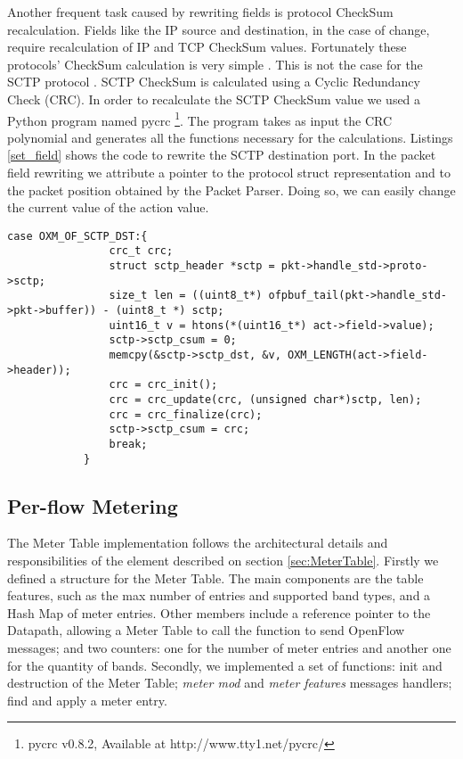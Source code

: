 Another frequent task caused by rewriting fields is protocol CheckSum recalculation. Fields like the IP source and destination, in the case of change, require recalculation of IP and TCP CheckSum values. Fortunately these protocols' CheckSum calculation is very simple \cite{rfc1071}. This is not the case for the SCTP protocol \cite{rfc3309}. SCTP CheckSum is calculated using a Cyclic Redundancy Check (CRC). In order to recalculate the SCTP CheckSum value we used a Python program named pycrc \footnote{pycrc v0.8.2, Available at http://www.tty1.net/pycrc/}. The program takes as input the CRC polynomial and generates all the functions necessary for the calculations. Listings \ref{set_field} shows the code to rewrite the SCTP destination port. In the packet field rewriting we attribute a pointer to the protocol struct representation and to the packet position obtained by the Packet Parser. Doing so, we can easily change the current value of the action value.
\\
\begin{lstlisting}[caption={Ethernet parsing in the nbee_link module}, label=set_field,]
case OXM_OF_SCTP_DST:{
                crc_t crc;
                struct sctp_header *sctp = pkt->handle_std->proto->sctp;                
                size_t len = ((uint8_t*) ofpbuf_tail(pkt->handle_std->pkt->buffer)) - (uint8_t *) sctp;
                uint16_t v = htons(*(uint16_t*) act->field->value);
                sctp->sctp_csum = 0;
                memcpy(&sctp->sctp_dst, &v, OXM_LENGTH(act->field->header));
                crc = crc_init();
                crc = crc_update(crc, (unsigned char*)sctp, len);                            
                crc = crc_finalize(crc);
                sctp->sctp_csum = crc;
                break;        
            }
\end{lstlisting}  

\subsection{Per-flow Metering}

    The Meter Table implementation follows the architectural details and responsibilities of the element described on section \ref{sec:MeterTable}.
Firstly we defined a structure for the Meter Table. The main components are the table features, such as the max number of entries and supported band types, and a Hash Map of meter entries. Other members include a reference pointer to the Datapath, allowing a Meter Table to call the function to send OpenFlow messages; and two counters: one for the number of meter entries and another one for the quantity of bands. Secondly, we implemented a set of functions: init and destruction of the Meter Table; \textit{meter mod} and \textit{meter features} messages handlers; find and apply a meter entry.

